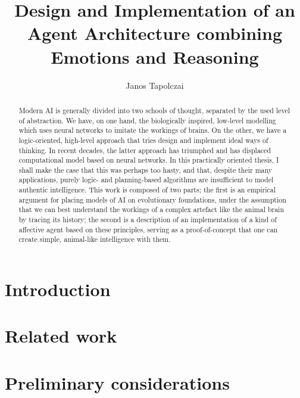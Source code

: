 \documentclass[bibliography=totoc ]{scrartcl}
\title{{\huge Design and Implementation of an Agent Architecture combining Emotions and Reasoning}}
\author{Janos Tapolczai}
\begin{document}
\maketitle


\begin{abstract}
Modern AI is generally divided into two schools of thought, separated by the used level of abstraction. We have, on one hand, the biologically inspired, low-level modelling which uses neural networks to imitate the workings of brains. On the other, we have a logic-oriented, high-level approach that tries design and implement ideal ways of thinking. In recent decades, the latter approach has triumphed and has displaced computational model based on neural networks. In this practically oriented thesis, I shall make the case that this was perhaps too hasty, and that, despite their many applications, purely logic- and planning-based algorithms are insufficient to model authentic intelligence. This work is composed of two parts; the first is an empirical argument for placing models of AI on evolutionary foundations, under the assumption that we can best understand the workings of a complex artefact like the animal brain by tracing its history; the second is a description of an implementation of a kind of affective agent based on these principles, serving as a proof-of-concept that one can create simple, animal-like intelligence with them.
\end{abstract}

\newpage

\hypersetup{linkcolor=black}
\tableofcontents
\hypersetup{linkcolor=DeepBlue}
\newpage

\begingroup
\let\clearpage\relax

\section{Introduction}



\section{Related work}\label{sec:relatedWork}



\section{Preliminary considerations}\label{sec:preliminaries}
\end{document}
